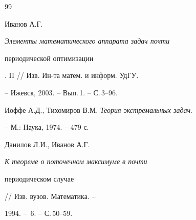 \begin{thebibliography}{99}

Иванов А.Г. {\em Элементы математического аппарата задач почти 

периодической оптимизации}. II // Изв. Ин-та матем. и информ. УдГУ.

-- Ижевск, 2003. -- Вып.\,1. -- С.\,3--96.


Иоффе А.Д., Тихомиров В.М. {\em Теория экстремальных задач}. 

-- М.: Наука, 1974. -- 479 с.


Данилов Л.И., Иванов А.Г. {\em К теореме о поточечном максимуме в почти 

периодическом случае} // Изв. вузов. Математика. --

1994. -- \No\,6. -- С.\,50--59.



\end{thebibliography}